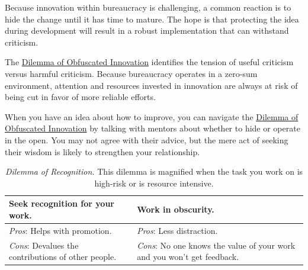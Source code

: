 Because innovation within bureaucracy is challenging, a common reaction is to hide the change until it has time to mature. The hope is that protecting the idea during development will result in a robust implementation that can withstand criticism. 

The \hyperref[table:dilemma-personal-innovate-open-obscure]{Dilemma of Obfuscated Innovation} identifies the tension of useful criticism versus harmful criticism. Because bureaucracy operates in a zero-sum environment, attention and resources invested in innovation are always at risk of being cut in favor of more reliable efforts. 

When you have an idea about how to improve, you can navigate the \hyperref[table:dilemma-personal-innovate-open-obscure]{Dilemma of Obfuscated Innovation} by talking with mentors about whether to hide or operate in the open. You may not agree with their advice, but the mere act of seeking their wisdom is likely to strengthen your relationship. 



\begin{center}
\begin{table}[H] %
\begin{tabular}{ | m{\dilemmatablewidth}| m{\dilemmatablewidth} | } 
  \hline
  \textbf{Seek recognition for your work.} &
  \textbf{Work in obscurity.} \\
  \hline
  \textit{Pros}: Helps with promotion. & 
  \textit{Pros}: Less distraction. \\
  \hline
  \textit{Cons}: Devalues the contributions of other people. & 
  \textit{Cons}: No one knows the value of your work and you won't get feedback. \\
  \hline
\end{tabular}
\caption{
\textit{Dilemma of Recognition.}
This dilemma is magnified when the task you work on is high-risk or is resource intensive. 
}
\label{table:dilemma-personal-recognition-obscurity}
\end{table}
\end{center}

